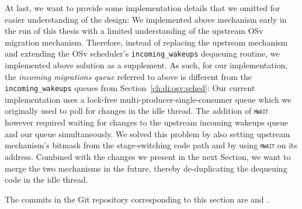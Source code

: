 \documentclass[12pt,a4paper]{book}
\begin{document}
At last, we want to provide some implementation details that we omitted for easier understanding of the design:
We implemented above mechanism early in the run of this thesis with a limited understanding of the upstream OSv migration mechanism.
Therefore, instead of replacing the upstream mechanism and extending the OSv scheduler's \lstinline[style=figurecpp]{incoming_wakeups} dequeuing routine,
we implemented above solution as a supplement.
As such, for our implementation, the \emph{incoming migrations queue} referred to above is different from the \lstinline[style=figurecpp]{incoming_wakeups} queues from Section~\ref{ch:di:osv:sched}:
Our current implementation uses a lock-free multi-producer-single-consumer queue which we originally used to poll for changes in the idle thread.
The addition of \textsc{\texttt{mwait}} however required waiting for changes to the upstream incoming wakeups queue and our queue simultaneously.
We solved this problem by also setting upstream mechanism's bitmask from the stage-switching code path and by using \textsc{\texttt{mwait}} on its address.
Combined with the changes we present in the next Section, we want to merge the two mechanisms in the future, thereby de-duplicating the dequeuing code in the idle thread.

The commits in the Git repository corresponding to this section are  and .
\end{document}
